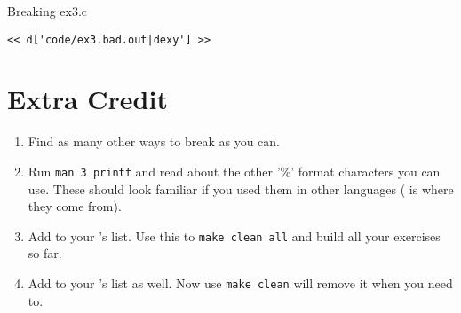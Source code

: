 \begin{Terminal}{Breaking ex3.c}
\begin{lstlisting}
<< d['code/ex3.bad.out|dexy'] >>
\end{lstlisting}
\end{Terminal}

\section{Extra Credit}

\begin{enumerate}
\item Find as many other ways to break  as you can.
\item Run \verb|man 3 printf| and read about the other '\%' format
    characters you can use.  These should look familiar if you used
    them in other languages ( is where they come from).
\item Add  to your 's  list.  Use this
    to \verb|make clean all| and build all your exercises so far.
\item Add  to your 's  list as well.
    Now use \verb|make clean| will remove it when you need to.
\end{enumerate}


